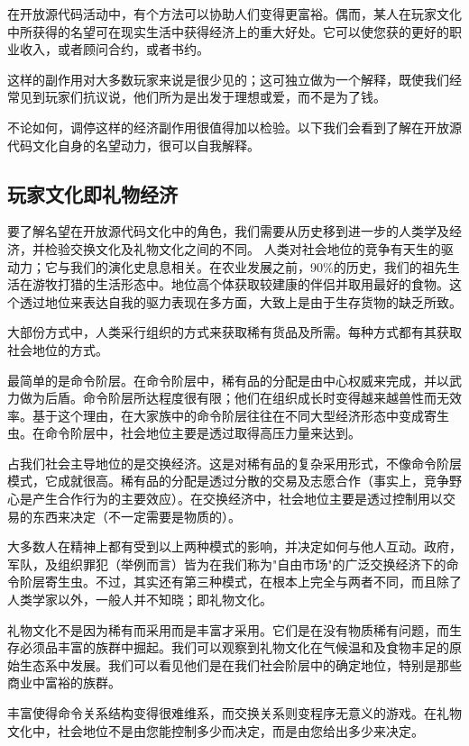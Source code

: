 在开放源代码活动中，有个方法可以协助人们变得更富裕。偶而，某人在玩家文化中所获得的名望可在现实生活中获得经济上的重大好处。它可以使您获的更好的职业收入，或者顾问合约，或者书约。

这样的副作用对大多数玩家来说是很少见的；这可独立做为一个解释，既使我们经常见到玩家们抗议说，他们所为是出发于理想或爱，而不是为了钱。

不论如何，调停这样的经济副作用很值得加以检验。以下我们会看到了解在开放源代码文化自身的名望动力，很可以自我解释。

\subsection{玩家文化即礼物经济}
要了解名望在开放源代码文化中的角色，我们需要从历史移到进一步的人类学及经济，并检验交换文化及礼物文化之间的不同。
人类对社会地位的竞争有天生的驱动力；它与我们的演化史息息相关。在农业发展之前，90\%的历史，我们的祖先生活在游牧打猎的生活形态中。地位高个体获取较建康的伴侣并取用最好的食物。这个透过地位来表达自我的驱力表现在多方面，大致上是由于生存货物的缺乏所致。

大部份方式中，人类采行组织的方式来获取稀有货品及所需。每种方式都有其获取社会地位的方式。

最简单的是命令阶层。在命令阶层中，稀有品的分配是由中心权威来完成，并以武力做为后盾。命令阶层所达程度很有限；他们在组织成长时变得越来越兽性而无效率。基于这个理由，在大家族中的命令阶层往往在不同大型经济形态中变成寄生虫。在命令阶层中，社会地位主要是透过取得高压力量来达到。

占我们社会主导地位的是交换经济。这是对稀有品的复杂采用形式，不像命令阶层模式，它成就很高。稀有品的分配是透过分散的交易及志愿合作（事实上，竞争野心是产生合作行为的主要效应）。在交换经济中，社会地位主要是透过控制用以交易的东西来决定（不一定需要是物质的）。

大多数人在精神上都有受到以上两种模式的影响，并决定如何与他人互动。政府，军队，及组织罪犯（举例而言）皆为在我们称为"自由市场"的广泛交换经济下的命令阶层寄生虫。不过，其实还有第三种模式，在根本上完全与两者不同，而且除了人类学家以外，一般人并不知晓；即礼物文化。

礼物文化不是因为稀有而采用而是丰富才采用。它们是在没有物质稀有问题，而生存必须品丰富的族群中掘起。我们可以观察到礼物文化在气候温和及食物丰足的原始生态系中发展。我们可以看见他们是在我们社会阶层中的确定地位，特别是那些商业中富裕的族群。

丰富使得命令关系结构变得很难维系，而交换关系则变程序无意义的游戏。在礼物文化中，社会地位不是由您能控制多少而决定，而是由您给出多少来决定。

